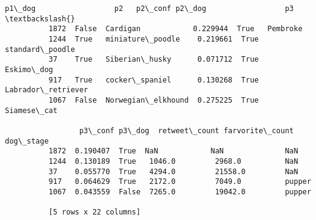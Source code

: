 \documentclass[11pt]{article}
\begin{document}
\begin{Verbatim}[commandchars=\\\{\}]
               p1\_dog                  p2   p2\_conf p2\_dog                  p3  \textbackslash{}
          1872  False  Cardigan            0.229944  True   Pembroke             
          1244  True   miniature\_poodle    0.219661  True   standard\_poodle      
          37    True   Siberian\_husky      0.071712  True   Eskimo\_dog           
          917   True   cocker\_spaniel      0.130268  True   Labrador\_retriever   
          1067  False  Norwegian\_elkhound  0.275225  True   Siamese\_cat          
          
                 p3\_conf p3\_dog  retweet\_count farvorite\_count  dog\_stage  
          1872  0.190407  True  NaN            NaN              NaN        
          1244  0.130189  True   1046.0         2968.0          NaN        
          37    0.055770  True   4294.0         21558.0         NaN        
          917   0.064629  True   2172.0         7049.0          pupper     
          1067  0.043559  False  7265.0         19042.0         pupper     
          
          [5 rows x 22 columns]
\end{Verbatim}
            
\end{document}

